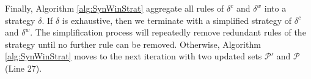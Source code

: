 \documentclass[review]{elsarticle}
\newcommand{\positiveSet}{\mathcal{P}}
\newcommand{\constraint}{\mathcal{C}}
\begin{document}
Finally, Algorithm \ref{alg:SynWinStrat} aggregate all rules of $\delta^c$ and $\delta^w$ into a strategy $\delta$. %
If $\delta$ is exhaustive, then we terminate with a simplified strategy of $\delta^c$ and $\delta^w$.
The simplification process will repeatedly remove redundant rules of the strategy until no further rule can be removed.
Otherwise, Algorithm \ref{alg:SynWinStrat} moves to the next iteration with two updated sets $\positiveSet'$ and $\positiveSet$ (Line 27).
\end{document}
